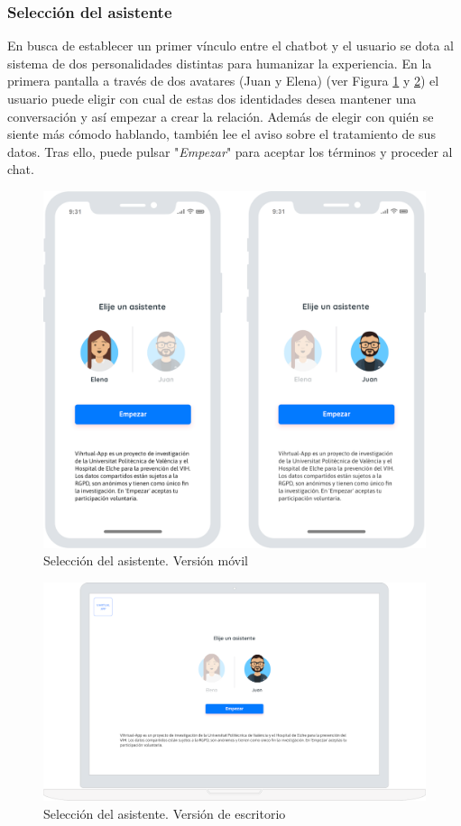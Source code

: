 \subsubsection{Selección del asistente}
En busca de establecer un primer vínculo entre el chatbot y el usuario se dota al sistema de dos personalidades distintas para humanizar la experiencia. En la primera pantalla a través de dos avatares (Juan y Elena) (ver Figura \ref{fig:mobile avatar} y \ref{fig:desktop avatar}) el usuario puede eligir con cual de estas dos identidades desea mantener una conversación y así empezar a crear la relación. Además de elegir con quién se siente más cómodo hablando, también lee el aviso sobre el tratamiento de sus datos. Tras ello, puede pulsar "\textit{Empezar}" para aceptar los términos y proceder al chat.\\

\begin{figure}[htbp]
\centering
\includegraphics[scale=0.2]{../images/mobile_avatar.png} 
\caption{Selección del asistente. Versión móvil}
\label{fig:mobile avatar}
\end{figure}

\begin{figure}[htbp]
\centering
\includegraphics[scale=0.2]{../images/desktop_avatar.png} 
\caption{Selección del asistente. Versión de escritorio}
\label{fig:desktop avatar}
\end{figure}

